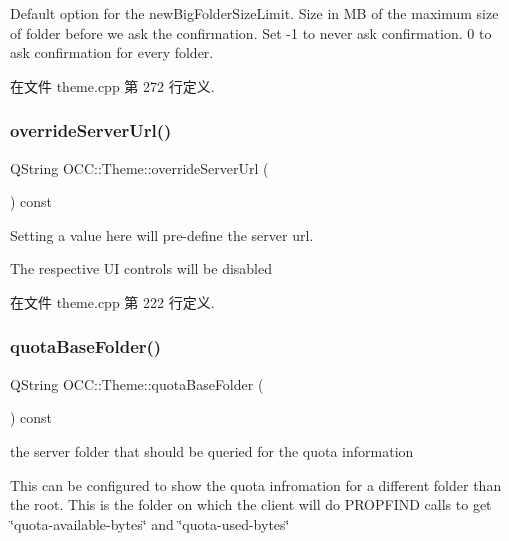 Default option for the new\+Big\+Folder\+Size\+Limit. Size in MB of the maximum size of folder before we ask the confirmation. Set -\/1 to never ask confirmation. 0 to ask confirmation for every folder. 

在文件 theme.\+cpp 第 272 行定义.

\mbox{\label{class_o_c_c_1_1_theme_a7e24755065ba1e7ade6eae55b767915f}} 
\subsubsection{\texorpdfstring{override\+Server\+Url()}{overrideServerUrl()}}
{\footnotesize\ttfamily Q\+String O\+C\+C\+::\+Theme\+::override\+Server\+Url (\begin{DoxyParamCaption}{ }\end{DoxyParamCaption}) const\hspace{0.3cm}{\ttfamily [virtual]}}

Setting a value here will pre-\/define the server url.

The respective UI controls will be disabled 

在文件 theme.\+cpp 第 222 行定义.

\mbox{\label{class_o_c_c_1_1_theme_a06d9dfd55efae0fa2dd5b13e829fefea}} 
\subsubsection{\texorpdfstring{quota\+Base\+Folder()}{quotaBaseFolder()}}
{\footnotesize\ttfamily Q\+String O\+C\+C\+::\+Theme\+::quota\+Base\+Folder (\begin{DoxyParamCaption}{ }\end{DoxyParamCaption}) const\hspace{0.3cm}{\ttfamily [virtual]}}



the server folder that should be queried for the quota information 

This can be configured to show the quota infromation for a different folder than the root. This is the folder on which the client will do P\+R\+O\+P\+F\+I\+ND calls to get \char`\"{}quota-\/available-\/bytes\char`\"{} and \char`\"{}quota-\/used-\/bytes\char`\"{}

